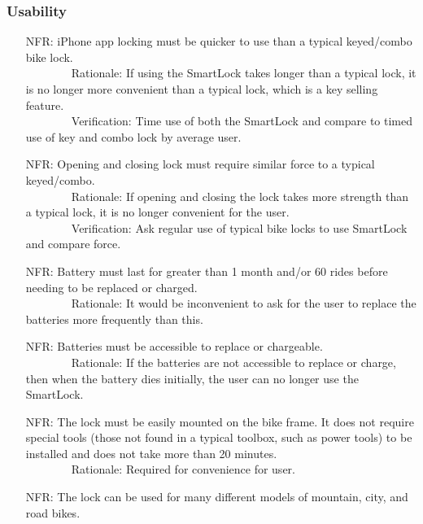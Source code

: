 \documentclass[12pt]{article}
\newcounter{nfrnum} %
\begin{document}
\subsubsection{Usability}
\begin{itemize}
\setlength{\itemindent}{.5in}
\item[NFR\refstepcounter{nfrnum}\thenfrnum\label{NFR11}:] iPhone app locking must be quicker to use than a typical keyed/combo bike lock.
\\ \-\ \-\ \-\ \-\ \-\ \-\ \-\ \-\ Rationale: If using the SmartLock takes longer than a typical lock, it is no longer more convenient than a typical lock, which is a key selling feature. 
\\ \-\ \-\ \-\ \-\ \-\ \-\ \-\ \-\ Verification: Time use of both the SmartLock and compare to timed use of key and combo lock by average user. 
\item[NFR\refstepcounter{nfrnum}\thenfrnum\label{NFR12}:] Opening and closing lock must require similar force to a typical keyed/combo.
\\ \-\ \-\ \-\ \-\ \-\ \-\ \-\ \-\ Rationale: If opening and closing the lock takes more strength than a typical lock, it is no longer convenient for the user. 
\\ \-\ \-\ \-\ \-\ \-\ \-\ \-\ \-\ Verification: Ask regular use of typical bike locks to use SmartLock and compare force. 
\item[NFR\refstepcounter{nfrnum}\thenfrnum\label{NFR13}:] Battery must last for greater than 1 month and/or 60 rides before needing to be replaced or charged.
\\ \-\ \-\ \-\ \-\ \-\ \-\ \-\ \-\ Rationale: It would be inconvenient to ask for the user to replace the batteries more frequently than this.
\item[NFR\refstepcounter{nfrnum}\thenfrnum\label{NFR14}:] Batteries must be accessible to replace or chargeable.
\\ \-\ \-\ \-\ \-\ \-\ \-\ \-\ \-\ Rationale: If the batteries are not accessible to replace or charge, then when the battery dies initially, the user can no longer use the SmartLock.
\item[NFR\refstepcounter{nfrnum}\thenfrnum\label{NFR15}:] The lock must be easily mounted on the bike frame. It does not require special tools (those not found in a typical toolbox, such as power tools) to be installed and does not take more than 20 minutes. 
\\ \-\ \-\ \-\ \-\ \-\ \-\ \-\ \-\ Rationale: Required for convenience for user. 
\item[NFR\refstepcounter{nfrnum}\thenfrnum\label{NFR16}:] The lock can be used for many different models of mountain, city, and road bikes. 

\end{itemize}
\end{document}
